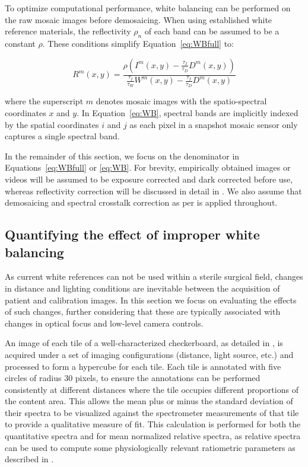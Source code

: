 To optimize computational performance, white balancing can be performed on the raw mosaic images before demosaicing. When using established white reference materials, the reflectivity $\rho_n$ of each band can be assumed to be a constant $\rho$. These conditions simplify Equation~\eqref{eq:WBfull} to:
%
\begin{linenomath*}
\begin{equation}
    R^m(x,y) = \frac{\rho\left(I^m(x,y) - \frac{\tau_I}{\tau_D}D^m(x,y)\right)}{\frac{\tau_I}{\tau_W}W^m(x,y) - \frac{\tau_I}{\tau_D}D^m(x,y)}
\label{eq:WB}
\end{equation}
\end{linenomath*}
where the superscript $m$ denotes mosaic images with the spatio-spectral coordinates $x$ and $y$.
In Equation~\eqref{eq:WB}, spectral bands are implicitly indexed by the spatial coordinates $i$ and $j$ as each pixel in a snapshot mosaic sensor only captures a single spectral band.

In the remainder of this section, we focus on the denominator in Equations~\eqref{eq:WBfull} or \eqref{eq:WB}.
For brevity, empirically obtained images or videos will be assumed to be exposure corrected and dark corrected before use, whereas reflectivity correction will be discussed in detail in .
We also assume that demosaicing and spectral crosstalk correction as per \citet{Pichette2017} is applied throughout.

%
\subsection{Quantifying the effect of improper white balancing}
\label{methodmotivation}
%
As current white references 
%
can not be used within
a sterile surgical field, changes in distance and lighting conditions are inevitable between the acquisition of patient and calibration images. 
%
In this section we focus on evaluating the effects of such changes, further considering that these are typically associated with changes in optical focus and low-level camera controls.
%

An image of each tile of a well-characterized checkerboard, as detailed in , is acquired under a set of imaging configurations (distance, light source, etc.) and processed to form a hypercube for each tile.
%
Each tile is annotated with five circles of radius 30 pixels, to ensure the annotations can be performed consistently at different distances where the tile occupies different proportions of the content area. This allows the mean plus or minus the standard deviation of their spectra to be visualized against the spectrometer measurements of that tile to provide a qualitative measure of fit.
This calculation is performed for both the quantitative spectra and for mean normalized relative spectra, as relative spectra can be used to compute some physiologically relevant ratiometric parameters as described in . 

